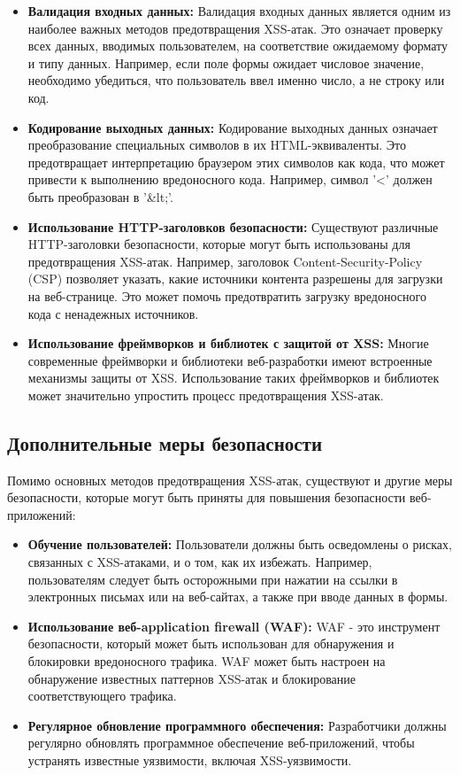 \documentclass[a4paper,12pt]{diplom}
\begin{document}
	 \begin{itemize}
	 	\item \textbf{Валидация входных данных:}  Валидация входных данных является одним из наиболее важных методов предотвращения XSS-атак.  Это означает проверку всех данных,  вводимых пользователем,  на соответствие ожидаемому формату и типу данных.  Например,  если поле формы ожидает числовое значение,  необходимо убедиться,  что пользователь ввел именно число,  а не строку или код. 
	 	\item \textbf{Кодирование выходных данных:}  Кодирование выходных данных означает преобразование специальных символов в их HTML-эквиваленты.  Это предотвращает интерпретацию браузером этих символов как кода,  что может привести к выполнению вредоносного кода.  Например,  символ '<' должен быть преобразован в '\&lt;'. 
	 	\item \textbf{Использование HTTP-заголовков безопасности:}  Существуют различные HTTP-заголовки безопасности,  которые могут быть использованы для предотвращения XSS-атак.  Например,  заголовок Content-Security-Policy (CSP) позволяет указать,  какие источники контента разрешены для загрузки на веб-странице.  Это может помочь предотвратить загрузку вредоносного кода с ненадежных источников. 
	 	\item \textbf{Использование фреймворков и библиотек с защитой от XSS:}  Многие современные фреймворки и библиотеки веб-разработки имеют встроенные механизмы защиты от XSS.  Использование таких фреймворков и библиотек может значительно упростить процесс предотвращения XSS-атак. 
	 \end{itemize}
	 
	 \subsection{Дополнительные меры безопасности}
	 
	 Помимо основных методов предотвращения XSS-атак, существуют и другие меры безопасности, которые могут быть приняты для повышения безопасности веб-приложений:
	 
	 \begin{itemize}
	 	\item \textbf{Обучение пользователей:}  Пользователи должны быть осведомлены о рисках,  связанных с XSS-атаками,  и о том,  как их избежать.  Например,  пользователям следует быть осторожными при нажатии на ссылки в электронных письмах или на веб-сайтах,  а также при вводе данных в формы. 
	 	\item \textbf{Использование веб-application firewall (WAF):}  WAF - это инструмент безопасности,  который может быть использован для обнаружения и блокировки вредоносного трафика.  WAF может быть настроен на обнаружение известных паттернов XSS-атак и блокирование соответствующего трафика. 
	 	\item \textbf{Регулярное обновление программного обеспечения:}  Разработчики должны регулярно обновлять программное обеспечение веб-приложений,  чтобы устранять известные уязвимости,  включая XSS-уязвимости. 
	 \end{itemize}
	 
\end{document}
